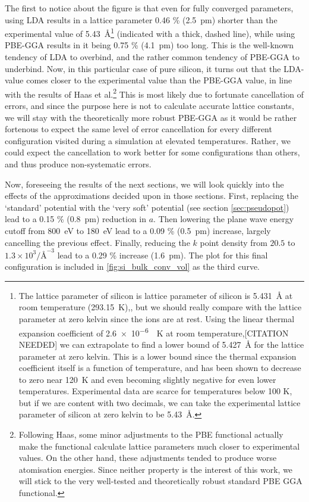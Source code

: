 \documentclass[11pt,bibliography=totoc,index=totoc]{scrbook}   %
\begin{document}
The first to notice about the figure is that even for fully converged parameters, using LDA results in a lattice parameter 0.46 \% (2.5~pm) shorter than the experimental value of 5.43~Å\footnote{The lattice parameter of silicon is lattice parameter of silicon is \SI{5.431}{\angstrom} at room temperature (\SI{293.15}{\kelvin}),\cite{CODATA:2006}, but we should really compare with the lattice parameter at zero kelvin since the ions are at rest.
Using the linear thermal expansion coefficient of \SI{2.6e-6}{\per\kelvin} at room temperature,[CITATION NEEDED]
we can extrapolate to find a lower bound of \SI{5.427}{\angstrom} for the lattice parameter at zero kelvin. This is a lower bound since the thermal expansion coefficient itself is a function of temperature, and has been shown to decrease to zero near \SI{120}{\kelvin} and even becoming slightly negative for even lower temperatures.\cite{Sugino:1990} Experimental data are scarce for temperatures below 100 K, but if we are content with two decimals, we can take the experimental lattice parameter of silicon at zero kelvin to be \SI{5.43}{\angstrom}.}
(indicated with a thick, dashed line), while using PBE-GGA results in it being 0.75 \% (4.1~pm) too long.
This is the well-known tendency of LDA to overbind, and the rather common tendency of PBE-GGA to underbind.
Now, in this particular case of pure silicon, it turns out that the LDA-value comes closer to the experimental value than the PBE-GGA value, in line with the results of Haas et al.\cite{Haas:2010}\footnote{Following Haas, some minor adjustments to the PBE functional actually make the functional calculate lattice parameters much closer to experimental values.
On the other hand, these adjustments tended to produce worse atomisation energies. Since neither property is the interest of this work, we will stick to the very well-tested and theoretically robust standard PBE GGA functional.}
This is most likely due to fortunate cancellation of errors,\cite[see e.g.][167]{Martin:2004} and since the purpose here is not to calculate accurate lattice constants, we will stay with the theoretically more robust PBE-GGA as it would be rather fortenous to expect the same level of error cancellation for every different configuration visited during a simulation at elevated temperatures. 
Rather, we could expect the cancellation to work better for some configurations than others, and thus produce non-systematic errors.


Now, foreseeing the results of the next sections, we will look quickly into the effects of the approximations decided upon in those sections. 
First, replacing the `standard' potential with the `very soft' potential (see section \ref{sec:pseudopot}) lead to a 0.15 \% (0.8~pm) reduction in $a$.
Then lowering the plane wave energy cutoff from 800~eV to 180~eV lead to a 0.09 \% (0.5~pm) increase, largely cancelling the previous effect.
Finally, reducing the $k$ point density from $20.5$ to $1.3\times 10^3 / \text{Å}^{-3}$ lead to a 0.29 \% increase (1.6~pm). 
The plot for this final configuration is included in \ref{fig:si_bulk_conv_vol} as the third curve.
\end{document}

